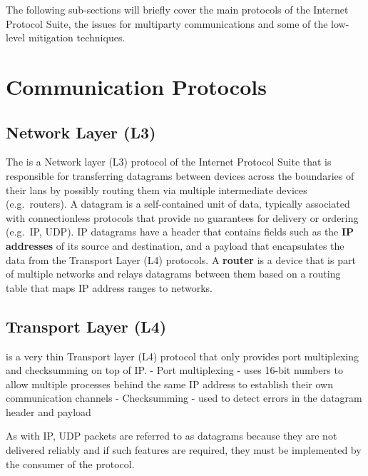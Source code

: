 The following sub-sections will briefly cover the main protocols of the Internet Protocol Suite, the issues for multiparty communications and some of the low-level mitigation techniques.


\section{Communication Protocols}\label{thesis__020-internet.md__communication-protocols}

\subsection{Network Layer (L3)}\label{thesis__020-internet.md__network-layer-l3}

The  \autocite{ipv4RFC} is a Network layer (L3) protocol of the Internet Protocol Suite that is responsible for transferring datagrams between devices across the boundaries of their \glspl{lan} by possibly routing them via multiple intermediate devices (e.g.~routers). A datagram is a self-contained unit of data, typically associated with connectionless protocols that provide no guarantees for delivery or ordering (e.g.~IP, UDP).  IP datagrams have a header that contains fields such as the \textbf{IP addresses} of its source and destination, and a  payload that encapsulates the data from the Transport Layer (L4) protocols. A \textbf{router} is a device that is part of multiple networks and relays datagrams between them based on a routing table that maps IP address ranges to networks.

\subsection{Transport Layer (L4)}\label{thesis__020-internet.md__transport-layer-l4}

 is a very thin Transport layer (L4) protocol that only provides port multiplexing and checksumming on top of IP.
- Port multiplexing - uses 16-bit numbers to allow multiple processes behind the same IP address to establish their own communication channels
- Checksumming - used to detect errors in the datagram header and payload

As with IP, UDP packets are referred to as datagrams because they are not delivered reliably and if such features are required, they must be implemented by the consumer of the protocol.

